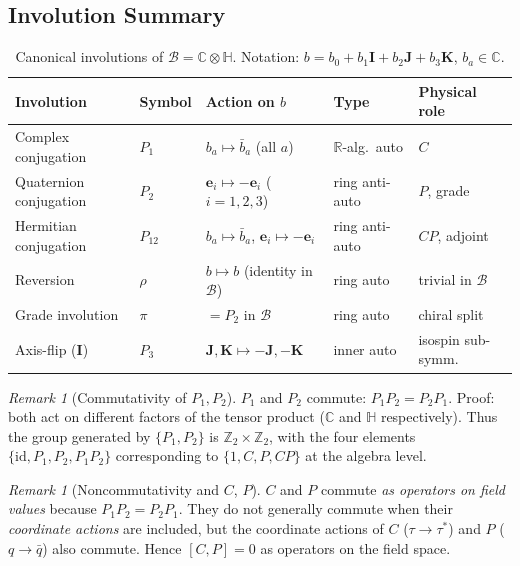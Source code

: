 \documentclass[12pt,a4paper]{article}
\theoremstyle{definition}
\theoremstyle{remark}
\newtheorem{remark}[theorem]{Remark}
\begin{document}
\subsection{Involution Summary}
\label{sec:ds:involution_summary}

\begin{table}[h]
\centering
\caption{Canonical involutions of $\mathcal{B}=\mathbb{C}\otimes\mathbb{H}$.
  Notation: $b = b_0 + b_1\mathbf{I} + b_2\mathbf{J} + b_3\mathbf{K}$,
  $b_a\in\mathbb{C}$.}
\label{tab:ds:involutions}
\begin{tabular}{@{}lllll@{}}
\toprule
Involution & Symbol & Action on $b$ & Type & Physical role \\
\midrule
Complex conjugation   & $P_1$ & $b_a \mapsto \bar{b}_a$ (all $a$)
  & $\mathbb{R}$-alg.\ auto & $C$ \\
Quaternion conjugation & $P_2$ & $\mathbf{e}_i \mapsto -\mathbf{e}_i$ ($i=1,2,3$)
  & ring anti-auto & $P$, grade \\
Hermitian conjugation & $P_{12}$ & $b_a \mapsto \bar{b}_a$, $\mathbf{e}_i\mapsto -\mathbf{e}_i$
  & ring anti-auto & $CP$, adjoint \\
Reversion             & $\rho$   & $b \mapsto b$ (identity in $\mathcal{B}$)
  & ring auto & trivial in $\mathcal{B}$ \\
Grade involution      & $\pi$    & $= P_2$ in $\mathcal{B}$
  & ring auto & chiral split \\
Axis-flip ($\mathbf{I}$) & $P_3$ & $\mathbf{J},\mathbf{K}\mapsto -\mathbf{J},-\mathbf{K}$
  & inner auto & isospin sub-symm. \\
\bottomrule
\end{tabular}
\end{table}

\begin{remark}[Commutativity of $P_1, P_2$]
$P_1$ and $P_2$ commute: $P_1 P_2 = P_2 P_1$.  Proof: both act on different
factors of the tensor product ($\mathbb{C}$ and $\mathbb{H}$ respectively).
Thus the group generated by $\{P_1,P_2\}$ is $\mathbb{Z}_2\times\mathbb{Z}_2$,
with the four elements $\{\mathrm{id}, P_1, P_2, P_1P_2\}$ corresponding
to $\{1, C, P, CP\}$ at the algebra level.
\end{remark}

\begin{remark}[Noncommutativity and $C$, $P$]
$C$ and $P$ commute \emph{as operators on field values} because $P_1 P_2 = P_2 P_1$.
They do not generally commute when their \emph{coordinate actions} are included,
but the coordinate actions of $C$ ($\tau\to\tau^*$) and $P$ ($q\to\bar{q}$)
also commute.  Hence $[C,P]=0$ as operators on the field space.
\end{remark}
\end{document}
